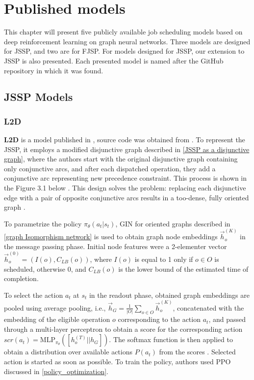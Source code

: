 \chapter{Published models}

This chapter will present five publicly available job scheduling models based on deep reinforcement learning on graph neural networks. Three models are designed for JSSP, and two are for FJSP. For models designed for JSSP, our extension to JSSP is also presented. Each presented model is named after the GitHub repository in which it was found. 

\section{JSSP Models}

\subsection{L2D}
\textbf{L2D} is a model published in \cite{zhang2020learning}, source code was obtained from \cite{github_l2d}. To represent the JSSP, it employs a modified disjunctive graph described in \ref{JSSP as a disjunctive graph}, where the authors start with the original disjunctive graph containing only conjunctive arcs, and after each dispatched operation, they add a conjunctive arc representing new precedence constraint. This process is shown in the Figure 3.1 below \cite{zhang2020learning}. This design solves the problem: replacing each disjunctive edge with a pair of opposite conjunctive arcs results in a too-dense, fully oriented graph \cite{zhang2020learning}.
\par
To parametrize the policy $\pi_\theta(a_t|s_t)$, GIN for oriented graphs described in \ref{graph Isomorphism network} is used to obtain graph node embeddings $\vec{h}_o^{(K)}$ in the message passing phase. Initial node features were a 2-elementer vector $\vec{h}_o^{(0)} = (I(o), C_{LB}(o))$, where $I(o)$ is equal to 1 only if $o \in O$ is scheduled, otherwise 0, and $C_{LB}(o)$ is the lower bound of the estimated time of completion. 
\par
To select the action $a_t$ at $s_t$ in the readout phase, obtained graph embeddings are pooled using average pooling, i.e., $\vec{h}_G = \frac{1}{|O|} \sum_{o \in O} \vec{h}_o^{(K)}$, concatenated with the embedding of the eligible operation $o$ corresponding to the action $a_t$, and passed through a multi-layer perceptron to obtain a score for the corresponding action $scr(a_t) = \text{MLP}_{\pi_\theta}\left ( \left [h_o^{(T)} || h_G \right ] \right )$. The softmax function is then applied to obtain a distribution over available actions $P(a_t)$ from the scores \cite{zhang2020learning}. Selected action is started as soon as possible. To train the policy, authors used PPO discussed in \ref{policy_optimization}.
